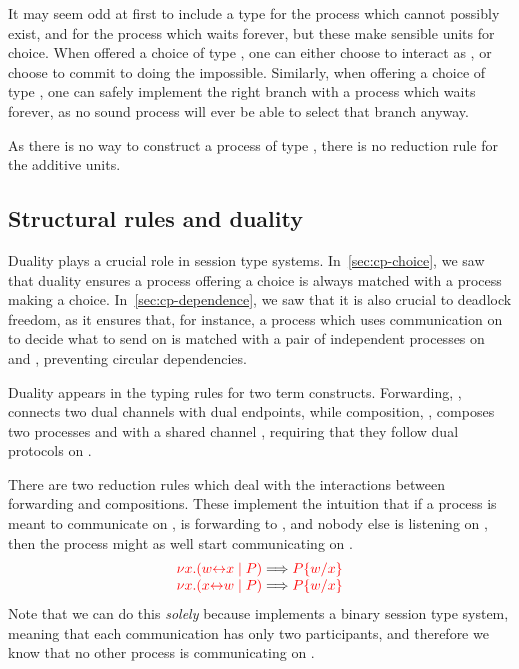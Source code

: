 It may seem odd at first to include a type for the process which cannot possibly
exist, and for the process which waits forever, but these make sensible units
for choice.
When offered a choice of type , one can either choose to
interact as , or choose to commit to doing the impossible.
Similarly, when offering a choice of type , one can safely
implement the right branch with a process which waits forever, as no sound
process will ever be able to select that branch anyway.
\begin{center}
  \cpInfNil
  \cpInfTop
\end{center}
As there is no way to construct a process of type \ty{\nil}, there is no
reduction rule for the additive units.


\subsection{Structural rules and duality}\label{sec:cp-duality}
Duality plays a crucial role in session type systems.
In~\cref{sec:cp-choice}, we saw that duality ensures a process offering a choice
is always matched with a process making a choice.
In~\cref{sec:cp-dependence}, we saw that it is also crucial to deadlock freedom,
as it ensures that, for instance, a process which uses communication on 
to decide what to send on  is matched with a pair of independent processes
on  and , preventing circular dependencies.

Duality appears in the typing rules for two \rcp term constructs.
Forwarding, , connects two dual channels with dual endpoints,
while composition, , composes two processes  and
 with a shared channel , requiring that they follow dual protocols
on .
\begin{center}
  \cpInfAx
  \cpInfCut
\end{center}
There are two reduction rules which deal with the interactions between
forwarding and compositions. These implement the intuition that if a process is
meant to communicate on ,  is forwarding to , and nobody else
is listening on , then the process might as well start communicating on
.
\[
  \begin{array}{c}
    \tm{\cpCut{x}{\cpLink{w}{x}}{P}} \Longrightarrow \tm{\cpSub{w}{x}{P}} 
    \\
    \tm{\cpCut{x}{\cpLink{x}{w}}{P}} \Longrightarrow \tm{\cpSub{w}{x}{P}}  
  \end{array}
\]
Note that we can do this \emph{solely} because \rcp implements a binary session
type system, meaning that each communication has only two participants, and
therefore we know that no other process is communicating on .

